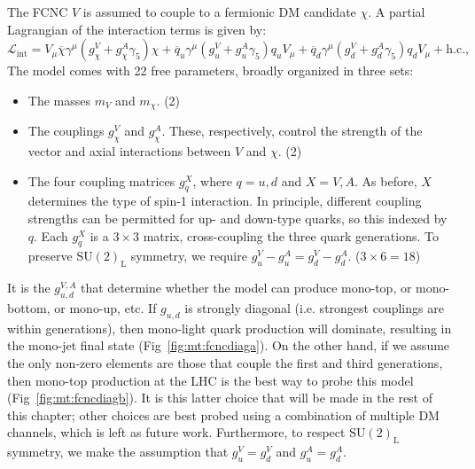 The FCNC $V$ is assumed to couple to a fermionic DM candidate $\chi$. 
A partial Lagrangian of the interaction terms is given by:
\begin{equation}
\mathcal{L}_\text{int}=  V_\mu  \overline\chi \gamma^\mu (  g^V_{\chi} + g^A_{\chi} \gamma_5 ) \chi
                           + \overline{q}_u \gamma^\mu
                           ( g^V_u + g^A_u \gamma_5 ) q_u V_\mu
                           + \overline{q}_{d} \gamma^\mu
                           (  g^V_{d} + g^A_{d} \gamma_5 ) q_d V_\mu
                           + \text{h.c.},
    \label{eq:Lfcnc}
\end{equation}
The model comes with 22 free parameters, broadly organized in three sets:
\begin{itemize}
    \item The masses $m_V$ and $m_\chi$. (2)
    \item The couplings $g_\chi^V$ and $g_\chi^A$. These, respectively, control the strength of the vector and axial interactions between $V$ and $\chi$. (2)
    \item The four coupling matrices $g_{q}^{X}$, where $q=u,d$ and $X=V,A$. 
          As before, $X$ determines the type of spin-1 interaction. 
          In principle, different coupling strengths can be permitted for up- and down-type quarks, so this indexed by $q$. 
          Each $g_{q}^{X}$ is a $3\times3$ matrix, cross-coupling the three quark generations. 
          To preserve $\mathrm{SU}(2)_\mathrm{L}$ symmetry, we require $g_u^V - g_u^A = g_d^V - g_d^A$. ($3\times6=18$)
\end{itemize}

It is the $g_{u,d}^{V,A}$ that determine whether the model can produce mono-top, or mono-bottom, or mono-up, etc. 
If $g_{u,d}$ is strongly diagonal (i.e. strongest couplings are within generations), then mono-light quark production will dominate, resulting in the mono-jet final state (Fig~\ref{fig:mt:fcncdiaga}).
On the other hand, if we assume the only non-zero elements are those that couple the first and third generations, then mono-top production at the LHC is the best way to probe this model (Fig~\ref{fig:mt:fcncdiagb}).
It is this latter choice that will be made in the rest of this chapter; other choices are best probed using a combination of multiple DM channels, which is left as future work.
Furthermore, to respect $\mathrm{SU}(2)_\mathrm{L}$ symmetry, we make the assumption that $g_u^V = g_d^V$ and $g_u^A = g_d^A$.

